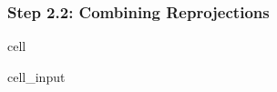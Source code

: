 \documentclass[letterpaper,10pt,english]{jupyterBook}
\begin{document}
\subsubsection{Step 2.2: Combining Reprojections}
\label{\detokenize{algorithm/CIMR_L2_TSA_PICASSO:step-2-2-combining-reprojections}}
\begin{sphinxuseclass}{cell}\begin{sphinxVerbatimInput}

\begin{sphinxuseclass}{cell_input}
\begin{sphinxVerbatim}[commandchars=\\\{\}]
   
\end{sphinxVerbatim}

\end{sphinxuseclass}\end{sphinxVerbatimInput}

\end{sphinxuseclass}
\end{document}
